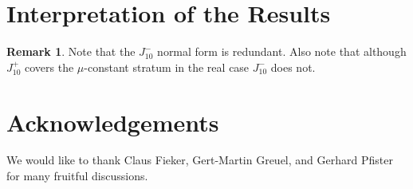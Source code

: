 \documentclass[noend]{amsproc}
\theoremstyle{definition}
\newtheorem{remark}[theorem]{Remark}
\begin{document}
\section{Interpretation of the Results}

\begin{remark}
Note that the $J_{10}^-$ normal form is redundant. Also note that although
$J_{10}^+$ covers the $\mu$-constant stratum in the real case $J_{10}^-$ does
not.
\end{remark}


\section{Acknowledgements}

We would like to thank Claus Fieker, Gert-Martin Greuel, and Gerhard Pfister
for many fruitful discussions.


\clearpage
\end{document}
